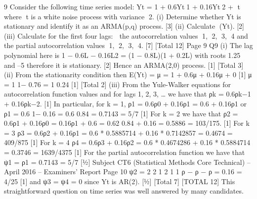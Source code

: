 9 Consider the following time series model:
  Yt = 1 + 0.6Yt1 + 0.16Yt2 + t
  where t is a white noise process with variance 2.
  (i) Determine whether Yt is stationary and identify it as an ARMA(p,q) process.
  [3]
  (ii) Calculate 􀜧(Yt). [2]
  (iii) Calculate for the first four lags:
     the autocorrelation values 1, 2, 3, 4 and
   the partial autocorrelation values 1, 2, 3, 4. [7]
  [Total 12]
  Page 9
  Q9 (i) The lag polynomial here is 1 − 0.6L − 0.16L2 = (1 − 0.8L)(1 + 0.2L) with roots
  1.25 and –5 therefore it is stationary. [2]
  Hence an ARMA(2,0) process. [1]
  [Total 3]
  (ii) From the stationarity condition then
  E(Yt) = μ = 1 + 0.6μ + 0.16μ + 0 [1]
  μ = 1
  1− 0.76
  = 1
  0.24
  [1]
  [Total 2]
  (iii) From the Yule-Walker equations for autocorrelation function values and for
  lags 1, 2, 3, … we have that ρk = 0.6ρk−1 + 0.16ρk−2. [1]
  In particular, for k = 1,
  ρ1 = 0.6ρ0 + 0.16ρ1 = 0.6 + 0.16ρ1
  or ρ1 =
    0.6
  1− 0.16 =
    0.6
  0.84 = 0.7143 = 5/7 [1]
  For k = 2 we have that
  ρ2 = 0.6ρ1 + 0.16ρ0 = 0.16ρ1 + 0.6 =
    0.62
  0.84 + 0.16
  = 0.5886 = 103/175. [1]
  For k = 3
  ρ3 = 0.6ρ2 + 0.16ρ1 = 0.6 * 0.5885714 + 0.16 * 0.7142857
  = 0.4674 = 409/875 [1]
  For k = 4
  ρ4 = 0.6ρ3 + 0.16ρ2 = 0.6 * 0.4674286 + 0.16 * 0.5884714
  = 0.3746 = 1639/4375 [1]
  For the partial autocorrelation function we have that
  ψ1 = ρ1 = 0.7143 = 5/7 [½]
  Subject CT6 (Statistical Methods Core Technical) – April 2016 – Examiners’ Report
  Page 10
  ψ2 =
    2
  2 1
  2
  1 1
  ρ − ρ
  − ρ
  = 0.16 = 4/25 [1]
  and ψ3 = ψ4 = 0 since Yt is AR(2). [½]
  [Total 7]
  [TOTAL 12]
  This straightforward question on time series was well answered by many
  candidates.
  
